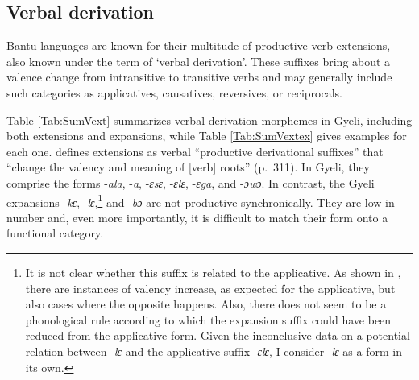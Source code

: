  













\subsection {Verbal derivation}
\label{sec:VDeriv}


Bantu languages are known for their multitude of productive verb extensions, also known under the term of `verbal derivation'. These suffixes  bring about a valence change from intransitive to transitive verbs and may generally include such categories as applicatives, causatives, reversives, or reciprocals.

Table \ref{Tab:SumVext} summarizes verbal derivation morphemes in Gyeli, including both extensions and expansions, while Table \ref{Tab:SumVextex} gives examples for each one. \citet{nurse08} defines extensions as verbal ``productive derivational suffixes'' that ``change the valency and meaning of [verb] roots'' (p.\ 311). In Gyeli, they comprise the forms -{\itshape ala}, -{\itshape a}, -{\itshape ɛsɛ}, -{\itshape ɛlɛ}, -{\itshape ɛga}, and -{\itshape ɔwɔ}. In contrast, the Gyeli expansions -{\itshape kɛ}, -{\itshape lɛ},\footnote{It is not clear whether this suffix is related to the applicative. As shown in , there are instances of valency increase, as expected for the applicative, but also cases where the opposite happens. Also, there does not seem to be a phonological rule according to which the expansion suffix could have been reduced from the applicative form. Given the inconclusive data on a potential relation between -{\itshape lɛ} and the applicative suffix -{\itshape ɛlɛ}, I consider -{\itshape lɛ} as a form in its own.} and -{\itshape bɔ} are not productive synchronically. They are low in number and, even more importantly, it is difficult to match their form onto a functional category.  


